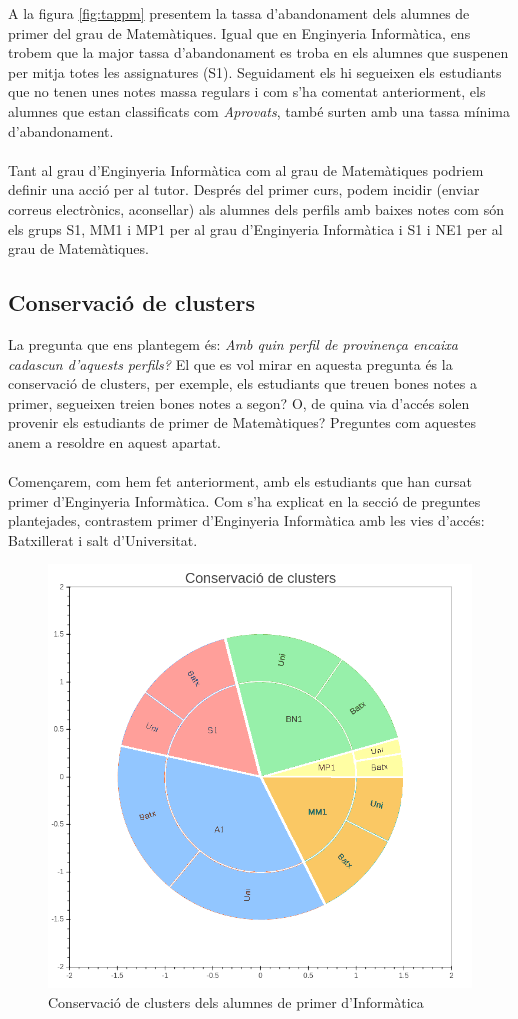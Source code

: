 \documentclass[12pt,a4paper,catalan]{article}
\begin{document}
A la figura \ref{fig:tappm} presentem la tassa d'abandonament dels alumnes de primer del grau de Matemàtiques. Igual que en Enginyeria Informàtica, ens trobem que la major tassa d'abandonament es troba en els alumnes que suspenen per mitja totes les assignatures (S1). Seguidament els hi segueixen els estudiants que no tenen unes notes massa regulars i com s'ha comentat anteriorment, els alumnes que estan classificats com \textit{Aprovats}, també surten amb una tassa mínima d'abandonament.
\\
\\
Tant al grau d'Enginyeria Informàtica com al grau de Matemàtiques podriem definir una acció per al tutor. Després del primer curs, podem incidir (enviar correus electrònics, aconsellar) als alumnes dels perfils amb baixes notes com són els grups S1, MM1 i MP1 per al grau d'Enginyeria Informàtica i S1 i NE1 per al grau de Matemàtiques.

\newpage

\subsection{Conservació de clusters}
\label{subsec:conservacioclusters}
La pregunta que ens plantegem és: \textit{Amb quin perfil de provinença encaixa cadascun d'aquests perfils?} El que es vol mirar en aquesta pregunta és la conservació de clusters, per exemple, els estudiants que treuen bones notes a primer, segueixen treien bones notes a segon? O, de quina via d'accés solen provenir els estudiants de primer de Matemàtiques? Preguntes com aquestes anem a resoldre en aquest apartat. 
\\
\\
Començarem, com hem fet anteriorment, amb els estudiants que han cursat primer d'Enginyeria Informàtica. Com s'ha explicat en la secció de preguntes plantejades, contrastem primer d'Enginyeria Informàtica amb les vies d'accés: Batxillerat i salt d'Universitat.

\begin{figure}[h]
\centering
\includegraphics[width=.6\linewidth]{img/conservacio_clusters_primer_info.png}
\caption{Conservació de clusters dels alumnes de primer d'Informàtica}
\label{fig:ccei1}
\end{figure}
\end{document}
